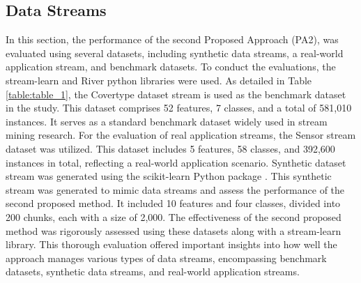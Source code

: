 \subsection{Data Streams}
\label{sec:data_stream}
In this section, the performance of the second Proposed Approach (PA2), was evaluated using several datasets, including synthetic data streams, a real-world application stream, and benchmark datasets. To conduct the evaluations, the stream-learn and River python libraries \cite{ksieniewicz2022stream} were used. As detailed in Table \ref{table:table_1}, the Covertype dataset stream is used as the benchmark dataset in the study. This dataset comprises 52 features, 7 classes, and a total of 581,010 instances. It serves as a standard benchmark dataset widely used in stream mining research. For the evaluation of real application streams, the Sensor stream dataset was utilized. This dataset includes 5 features, 58 classes, and 392,600 instances in total, reflecting a real-world application scenario. Synthetic dataset stream was generated using the scikit-learn Python package \cite{ksieniewicz2022stream}. This synthetic stream was generated to mimic data streams and assess the performance of the second proposed method. It included 10 features and four classes, divided into 200 chunks, each with a size of 2,000. The effectiveness of the second proposed method was rigorously assessed using these datasets along with a stream-learn library. This thorough evaluation offered important insights into how well the approach manages various types of data streams, encompassing benchmark datasets, synthetic data streams, and real-world application streams.

\begin{table}[H]
	\centering
	\caption{Summary of Dataset Characteristics Utilized in the PA2 Experimental.}

	\label{table:table_1}
	\end{table}

